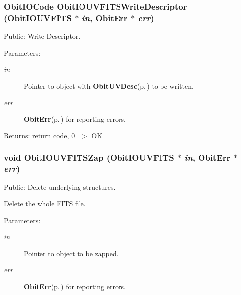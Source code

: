 \subsubsection{\setlength{\rightskip}{0pt plus 5cm}Obit\-IOCode Obit\-IOUVFITSWrite\-Descriptor ({\bf Obit\-IOUVFITS} $\ast$ {\em in}, {\bf Obit\-Err} $\ast$ {\em err})}\label{ObitIOUVFITS_8h_a22}


Public: Write Descriptor. 

\begin{Desc}
\item[Parameters:]
\begin{description}
\item[{\em in}]Pointer to object with {\bf Obit\-UVDesc}{\rm (p.\,\pageref{structObitUVDesc})} to be written. \item[{\em err}]{\bf Obit\-Err}{\rm (p.\,\pageref{structObitErr})} for reporting errors. \end{description}
\end{Desc}
\begin{Desc}
\item[Returns:]return code, 0=$>$ OK \end{Desc}
\subsubsection{\setlength{\rightskip}{0pt plus 5cm}void Obit\-IOUVFITSZap ({\bf Obit\-IOUVFITS} $\ast$ {\em in}, {\bf Obit\-Err} $\ast$ {\em err})}\label{ObitIOUVFITS_8h_a9}


Public: Delete underlying structures. 

Delete the whole FITS file. \begin{Desc}
\item[Parameters:]
\begin{description}
\item[{\em in}]Pointer to object to be zapped. \item[{\em err}]{\bf Obit\-Err}{\rm (p.\,\pageref{structObitErr})} for reporting errors. \end{description}
\end{Desc}
